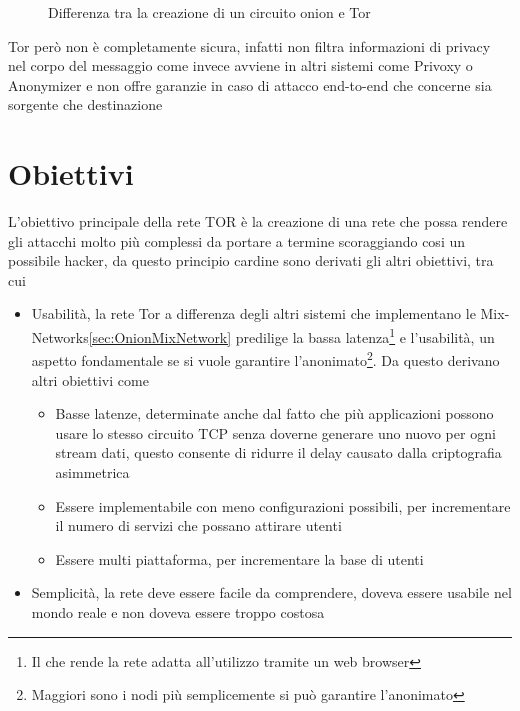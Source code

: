 \begin{figure}[htpb!]
    \centering
    
    \caption{Differenza tra la creazione di un circuito onion e Tor}
    \label{fig:telescopic}
\end{figure}

Tor però non è completamente sicura, infatti non filtra informazioni di privacy nel corpo del messaggio come invece avviene in altri sistemi come Privoxy o Anonymizer e non offre garanzie in caso di attacco end-to-end che concerne sia sorgente che destinazione
\cite{onionv2}

\section{Obiettivi}
L'obiettivo principale della rete TOR è la creazione di una rete che possa rendere gli attacchi molto più complessi da portare a termine scoraggiando cosi un possibile hacker, da questo principio cardine sono derivati gli altri obiettivi, tra cui
\begin{itemize}
    \item Usabilità, la rete Tor a differenza degli altri sistemi che implementano le Mix-Networks\ref{sec:OnionMixNetwork} predilige la bassa latenza\footnote{Il che rende la rete adatta all'utilizzo tramite un web browser} e l'usabilità, un aspetto fondamentale se si vuole garantire l'anonimato\footnote{Maggiori sono i nodi più semplicemente si può garantire l'anonimato}.
    Da questo derivano altri obiettivi come
    \begin{itemize}
        \item Basse latenze, determinate anche dal fatto che più applicazioni possono usare lo stesso circuito TCP senza doverne generare uno nuovo per ogni stream dati, questo consente di ridurre il delay causato dalla criptografia asimmetrica
        \item Essere implementabile con meno configurazioni possibili, per incrementare il numero di servizi che possano attirare utenti
        \item Essere multi piattaforma, per incrementare la base di utenti
    \end{itemize}
    \item Semplicità, la rete deve essere facile da comprendere, doveva essere usabile nel mondo reale e non doveva essere troppo costosa
\end{itemize}

\cite{ChaumMixes}
